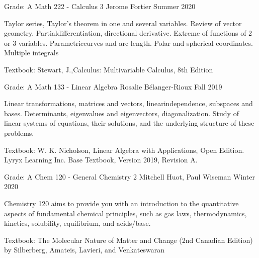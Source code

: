 \begin{cventries}
    \cventry
    {Grade: A} %
    {Math 222 - Calculus 3} %
    {Jerome Fortier} %
    {Summer 2020} %
    {
      \begin{cvitems} %
      \item {Taylor series, Taylor’s theorem in one and several variables. Review of vector geometry. Partialdifferentiation, directional derivative.  Extreme of functions of 2 or 3 variables.  Parametriccurves and arc length. Polar and spherical coordinates. Multiple integrals}
      \item {Textbook: Stewart, J.,Calculus: Multivariable Calculus, 8th Edition}
      \end{cvitems}
    }


    \cventry
    {Grade: A} %
    {Math 133 - Linear Algebra} %
    {Rosalie Bélanger-Rioux} %
    {Fall 2019} %
    {
      \begin{cvitems} %
      \item {Linear transformations, matrices and vectors, linearindependence, subspaces and bases. Determinants, eigenvalues and eigenvectors, diagonalization. Study of linear systems of equations, their solutions, and the underlying structure of these problems.}
      \item {Textbook: W. K. Nicholson, Linear Algebra with Applications, Open Edition. Lyryx Learning Inc. Base Textbook, Version 2019, Revision A.}
      \end{cvitems}
    }

\end{cventries}


\begin{cventries}
    \cventry
    {Grade: A} %
    {Chem 120 - General Chemistry 2} %
    {Mitchell Huot, Paul Wiseman} %
    {Winter 2020} %
    {
      \begin{cvitems} %
      \item {Chemistry 120 aims to provide you with an introduction to the quantitative aspects of fundamental chemical principles, such as gas laws, thermodynamics, kinetics, solubility, equilibrium, and acids/base.}
      \item {Textbook: The Molecular Nature of Matter and Change (2nd Canadian Edition) by Silberberg, Amateis, Lavieri, and Venkateswaran}
      \end{cvitems}
    }

\end{cventries}

